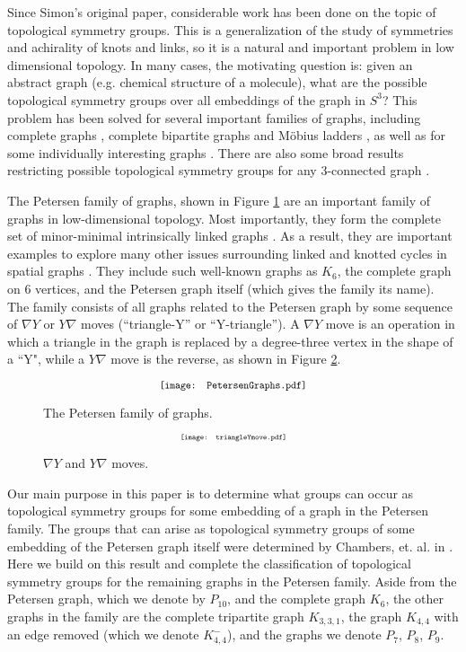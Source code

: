 \documentclass[11]{amsart}
\theoremstyle{definition}
\theoremstyle{remark}
\begin{document}
Since Simon's original paper, considerable work has been done on the topic of topological symmetry groups.  This is a generalization of the study of symmetries and achirality of knots and links, so it is a natural and important problem in low dimensional topology. In many cases, the motivating question is: given an abstract graph (e.g. chemical structure of a molecule), what are the possible topological symmetry groups over all embeddings of the graph in $S^3$? This problem has been solved for several important families of graphs, including complete graphs \cite{cf, cfo, fmn3, fnt},  complete bipartite graphs \cite{hmp} and M\"{o}bius ladders \cite{f1, fl}, as well as for some individually interesting graphs \cite{cfhltv, flw}.  There are also some broad results restricting possible topological symmetry groups for any 3-connected graph \cite{fnpt}.

The Petersen family of graphs, shown in Figure \ref{F:petersen} are an important family of graphs in low-dimensional topology.  Most importantly, they form the complete set of minor-minimal intrinsically linked graphs \cite{rst}. As a result, they are important examples to explore many other issues surrounding linked and knotted cycles in spatial graphs \cite{ni, od}. They include such well-known graphs as $K_6$, the complete graph on 6 vertices, and the Petersen graph itself (which gives the family its name).  The family consists of all graphs related to the Petersen graph by some sequence of $\nabla Y$ or $Y\nabla$ moves (``triangle-Y'' or ``Y-triangle''). A $\nabla Y$ move is an operation in which a triangle in the graph is replaced by a degree-three vertex in the shape of a ``Y", while a $Y\nabla$ move is the reverse, as shown in Figure \ref{F:triangleY}.

\begin{figure} [htbp]
$$\scalebox{.8}{\texttt{[image: PetersenGraphs.pdf]}}$$
\caption{The Petersen family of graphs.}
\label{F:petersen}
\end{figure}

\begin{figure} [htbp]
$$\scalebox{.6}{\texttt{[image: triangleYmove.pdf]}}$$
\caption{$\nabla Y$ and $Y\nabla$ moves.}
\label{F:triangleY}
\end{figure}

Our main purpose in this paper is to determine what groups can occur as topological symmetry groups for some embedding of a graph in the Petersen family.  The groups that can arise as  topological symmetry groups of some embedding of the Petersen graph itself were determined by Chambers, et. al. in \cite{cfhltv}.  Here we build on this result and complete the classification of topological symmetry groups for the remaining graphs in the Petersen family.  Aside from the Petersen graph, which we denote by $P_{10}$, and the complete graph $K_6$, the other graphs in the family are the complete tripartite graph $K_{3,3,1}$, the graph $K_{4,4}$ with an edge removed (which we denote $K_{4,4}^-$), and the graphs we denote $P_7$, $P_8$, $P_9$.  
\end{document}
